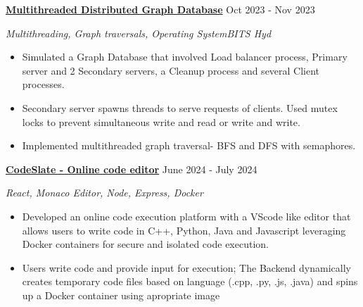 \documentclass[a4paper,12pt]{report}
\begin{document}
\noindent
\textbf{\href{https://github.com/sumansekharsahoo/Multithreaded-GraphDB}{\color{black}Multithreaded Distributed Graph Database}} \hfill  {\fontsize{12pt}{12pt}\selectfont Oct 2023 - Nov 2023} \par
\par
\noindent 
{\fontsize{12pt}{12pt}\selectfont \textit{Multithreading, Graph traversals, Operating System}\hfill\textit{BITS Hyd}} \par
\noindent 
\begin{itemize}[noitemsep,topsep=0pt]
    \item {\fontsize{12pt}{12pt}\selectfont Simulated a Graph Database that involved Load balancer process, Primary server and 2 Secondary servers, a Cleanup process and several Client processes.} \par
    \item {\fontsize{12pt}{12pt}\selectfont Secondary server spawns threads to serve requests of clients. Used mutex locks to prevent simultaneous write and read or write and write.} \par
    \item {\fontsize{12pt}{12pt}\selectfont Implemented multithreaded graph traversal- BFS and DFS  with semaphores.} \par
\end{itemize}

\vspace{3pt}
\noindent 
\textbf{\href{https://github.com/sumansekharsahoo/CodeSlate}{\color{black}CodeSlate - Online code editor}} \hfill  {\fontsize{12pt}{12pt}\selectfont June 2024 - July 2024} \par
\noindent
{\fontsize{12pt}{12pt}\selectfont \textit{React, Monaco Editor, Node, Express, Docker}} \par
\noindent 
\begin{itemize}[noitemsep,topsep=0pt]
    \item {\fontsize{12pt}{12pt}\selectfont Developed an online code execution platform with a VScode like editor that allows users to write code in C++, Python, Java and Javascript leveraging Docker containers for secure and isolated code execution.}  \par
    \item {\fontsize{12pt}{12pt}\selectfont Users write code and provide input for execution; The Backend dynamically creates temporary code files based on language (.cpp, .py, .js, .java) and spins up a Docker container using apropriate image}  \par
\end{itemize}
\end{document}
